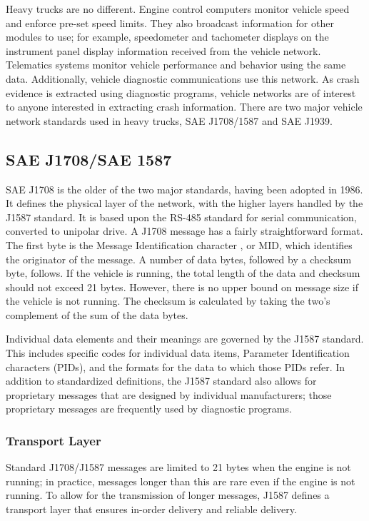 Heavy trucks are no different. Engine control computers monitor vehicle speed and enforce pre-set speed limits. They also broadcast information
for other modules to use; for example, speedometer and tachometer displays on the instrument panel display information received from the vehicle
network. Telematics systems monitor vehicle performance and behavior using the same data. Additionally, vehicle diagnostic communications use
this network. As crash evidence is extracted using diagnostic programs, vehicle networks are of interest to anyone interested in extracting
crash information. There are two major vehicle network standards used in heavy trucks, SAE J1708/1587\cite{J1708}\cite{J1587} and SAE J1939\cite{J1939-71}.

\subsection{SAE J1708/SAE 1587}

SAE J1708 is the older of the two major standards, having been adopted in 1986. It defines the physical layer of the network,
with the higher layers handled by the J1587 standard. It is based upon the RS-485 standard for serial communication, converted to 
unipolar drive. A J1708 message has a fairly straightforward format. The first byte is the Message Identification character
, or MID, which identifies the originator of the message. A number of data bytes, followed by a checksum byte, follows. If the vehicle is running, 
the total length of the data and checksum should not exceed 21 bytes\cite{J1708}. However, there is no upper bound on message size if the vehicle 
is not running. The checksum is calculated by taking the two's complement of the sum of the data bytes.

Individual data elements and their meanings are governed by the J1587 standard\cite{J1587}. This includes specific codes for individual data items,
Parameter Identification characters (PIDs), and the formats for the data to which those PIDs refer. In addition to standardized definitions, 
the J1587 standard also allows for proprietary messages that are designed by individual manufacturers; those proprietary messages are frequently used by 
diagnostic programs.

\subsubsection{Transport Layer}

Standard J1708/J1587 messages are limited to 21 bytes when the engine is not running; in practice, messages longer than this are rare even if the engine
is not running. To allow for the transmission of longer messages, J1587 defines a transport layer that ensures in-order delivery and reliable delivery.

